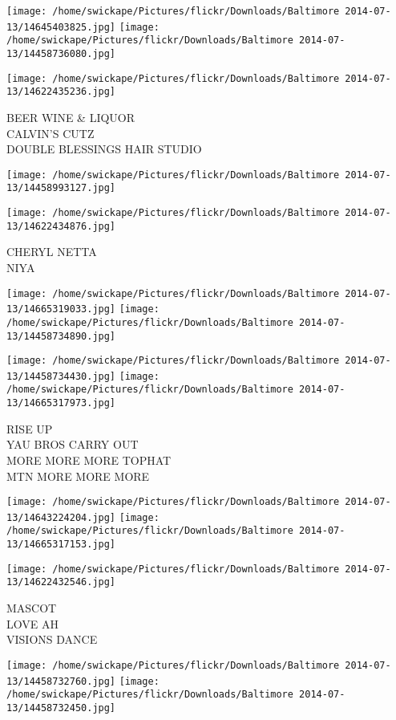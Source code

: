 \documentclass[10pt,letterpaper]{article}
\begin{document}
\texttt{[image: /home/swickape/Pictures/flickr/Downloads/Baltimore 2014-07-13/14645403825.jpg]}
\texttt{[image: /home/swickape/Pictures/flickr/Downloads/Baltimore 2014-07-13/14458736080.jpg]}

\texttt{[image: /home/swickape/Pictures/flickr/Downloads/Baltimore 2014-07-13/14622435236.jpg]}

BEER WINE \& LIQUOR\\
CALVIN'S CUTZ\\
DOUBLE BLESSINGS HAIR STUDIO
\pagebreak

\texttt{[image: /home/swickape/Pictures/flickr/Downloads/Baltimore 2014-07-13/14458993127.jpg]}

\vspace{0.25in}
\texttt{[image: /home/swickape/Pictures/flickr/Downloads/Baltimore 2014-07-13/14622434876.jpg]}

CHERYL NETTA\\
NIYA
\pagebreak

\texttt{[image: /home/swickape/Pictures/flickr/Downloads/Baltimore 2014-07-13/14665319033.jpg]}
\texttt{[image: /home/swickape/Pictures/flickr/Downloads/Baltimore 2014-07-13/14458734890.jpg]}

\texttt{[image: /home/swickape/Pictures/flickr/Downloads/Baltimore 2014-07-13/14458734430.jpg]}
\texttt{[image: /home/swickape/Pictures/flickr/Downloads/Baltimore 2014-07-13/14665317973.jpg]}

RISE UP\\
YAU BROS CARRY OUT\\
MORE MORE MORE TOPHAT\\
MTN MORE MORE MORE
\pagebreak

\texttt{[image: /home/swickape/Pictures/flickr/Downloads/Baltimore 2014-07-13/14643224204.jpg]}
\texttt{[image: /home/swickape/Pictures/flickr/Downloads/Baltimore 2014-07-13/14665317153.jpg]}

\vspace{0.25in}
\texttt{[image: /home/swickape/Pictures/flickr/Downloads/Baltimore 2014-07-13/14622432546.jpg]}

MASCOT\\
LOVE AH\\
VISIONS DANCE
\pagebreak

\texttt{[image: /home/swickape/Pictures/flickr/Downloads/Baltimore 2014-07-13/14458732760.jpg]}
\texttt{[image: /home/swickape/Pictures/flickr/Downloads/Baltimore 2014-07-13/14458732450.jpg]}
\end{document}
